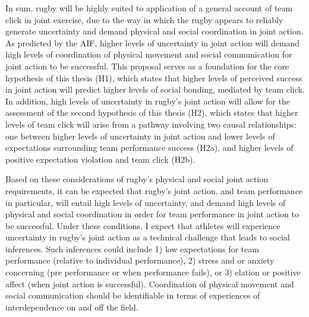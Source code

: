 \begin{CJK}{UTF8}{gbsn}
In sum, rugby will be highly suited to application of a general account of team click in joint exercise, due to the way in which the rugby appears to reliably generate uncertainty and demand physical and social coordination in joint action.  As predicted by the AIF, higher levels of uncertainty in joint action will demand high levels of coordination of physical movement and social communication for joint action to be successful.  This proposal serves as a foundation for the core hypothesis of this thesis (H1), which states that higher levels of perceived success in joint action will predict higher levels of social bonding, mediated by team click.  In addition, high levels of uncertainty in rugby's joint action will allow for the assessment of the second hypothesis of this thesis (H2), which states that higher levels of team click will arise from a pathway involving two causal relationships: one between higher levels of uncertainty in joint action and lower levels of expectations surrounding team performance success (H2a), and higher levels of positive expectation violation and team click (H2b).

Based on these considerations of rugby's physical and social joint action requirements, it can be expected that rugby's joint action, and team performance in particular, will entail high levels of uncertainty, and demand high levels of physical and social coordination in order for team performance in joint action to be successful.  Under these conditions, I expect that athletes will experience uncertainty in rugby's joint action as a technical challenge that leads to social inferences.  Such inferences could include 1) low expectations for team performance (relative to individual performance), 2) stress and or anxiety concerning (pre performance or when performance fails), or 3) elation or positive affect (when joint action is successful).  Coordination of physical movement and social communication should be identifiable in terms of experiences of interdependence on and off the field.




\end{CJK}
